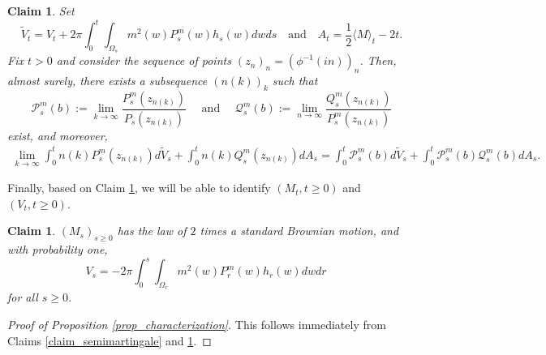 \documentclass{article}
\newtheorem{claim}[theorem]{Claim}
\theoremstyle{definition}
\theoremstyle{remark}
\theoremstyle{remark}
\begin{document}
\begin{claim}\label{claim_independence} Set
\begin{equation} \label{def_tildeV_A}
    \tilde V_t = V_t + 2\pi \int_{0}^{t} \int_{\Omega_s}m^2(w)P_s^m(w)h_s(w) dw ds \quad \text{and} 
    \quad A_t = \frac{1}{2} \langle M \rangle_t - 2t. 
\end{equation}
Fix $t > 0$ and consider the sequence of points $(z_n)_n = (\phi^{-1}(in))_n$. Then, almost surely, there exists a subsequence $(n(k))_k$ such that 
\begin{equation}\label{limPmQm}
     \mathcal{P}_{s}^{m}(b) := \lim_{k \to \infty} \frac{P_s^m(z_{n(k)})}{P_s(z_{n(k)})} \quad \text{ and } \quad \mathcal{Q}_{s}^{m}(b) := \lim_{n \to \infty} \frac{Q_s^m(z_{n( k)})}{P_s^m(z_{n(k)})} 
\end{equation}
exist, and moreover, 
\begin{align} \label{lim_SDE}
    \lim_{k \to \infty} \int_{0}^{t} n(k)P_{s}^{m}(z_{n( k)}) d\tilde V_{s} + \int_{0}^{t} n(k) Q_{s}^{m}(z_{n( k)}) d A_{s}
    = \int_{0}^{t} \mathcal{P}_{s}^{m}(b) d\tilde V_{s} + \int_{0}^{t} \mathcal{P}_{s}^{m}(b) \mathcal{Q}_{s}^{m}(b) d A_{s}.
\end{align}
\end{claim}

Finally, based on Claim \ref{claim_independence}, we will be able to identify $(M_t, t \geq 0)$ and $(V_t, t \geq 0)$.

\begin{claim}\label{claim_MV}
$(M_s)_{s\ge 0}$ has the law of $2$ times a standard Brownian motion, and with probability one,
\begin{equation*}
V_s = -2\pi \int_{0}^{s} \int_{\Omega_r} m^2(w)P_r^m(w)h_r(w)dwdr \quad 
\end{equation*}
for all $s\ge 0$.
\end{claim}

\begin{proof}[Proof of Proposition \ref{prop_characterization}]
This follows immediately from Claims \ref{claim_semimartingale} and \ref{claim_MV}.
\end{proof}
\end{document}
